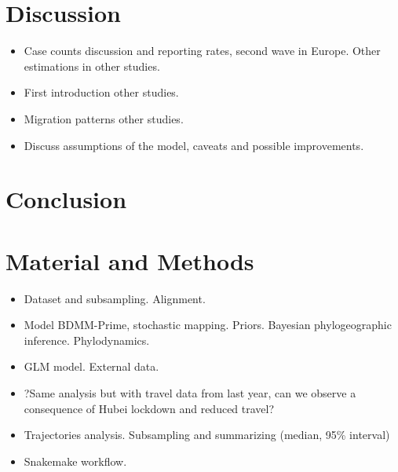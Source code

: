 \documentclass[12pt]{article}
\begin{document}
\section*{Discussion}

\begin{itemize}
\item Case counts discussion and reporting rates, second wave in Europe. Other estimations in other studies.



\item First introduction other studies. 

\item Migration patterns other studies.

\item Discuss assumptions of the model, caveats and possible improvements.
\end{itemize}

\section*{Conclusion}

\section*{Material and Methods}
\begin{itemize}
\item Dataset and subsampling. Alignment. 

\item Model BDMM-Prime, stochastic mapping. Priors. Bayesian phylogeographic inference. Phylodynamics.

\item GLM model. External data.

\item ?Same analysis but with travel data from last year, can we observe a consequence of Hubei lockdown and reduced travel?

\item Trajectories analysis. Subsampling and summarizing (median, 95\% interval)


\item Snakemake workflow.
\end{itemize}




\listoftodos
\end{document}
